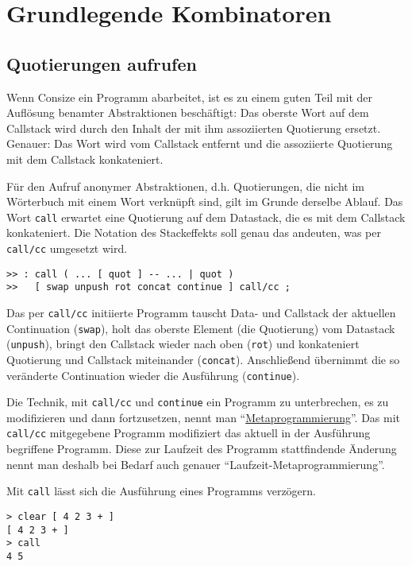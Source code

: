 \section{Grundlegende Kombinatoren}

\subsection{Quotierungen aufrufen}

Wenn Consize ein Programm abarbeitet, ist es zu einem guten Teil mit der Auflösung benamter Abstraktionen beschäftigt: Das oberste Wort auf dem Callstack wird durch den Inhalt der mit ihm assoziierten Quotierung ersetzt. Genauer: Das Wort wird vom Callstack entfernt und die assoziierte Quotierung mit dem Callstack konkateniert.

Für den Aufruf anonymer Abstraktionen, d.h. Quotierungen, die nicht im Wörterbuch mit einem Wort verknüpft sind, gilt im Grunde derselbe Ablauf. Das Wort \verb|call| erwartet eine Quotierung auf dem Datastack, die es mit dem Callstack konkateniert. Die Notation des Stackeffekts soll genau das andeuten, was per \verb|call/cc| umgesetzt wird.

\begin{verbatim}
>> : call ( ... [ quot ] -- ... | quot )
>>   [ swap unpush rot concat continue ] call/cc ;
\end{verbatim}

Das per \verb|call/cc| initiierte Programm tauscht Data- und Callstack der aktuellen Continuation (\verb|swap|), holt das oberste Element (die Quotierung) vom Datastack (\verb|unpush|), bringt den Callstack wieder nach oben (\verb|rot|) und konkateniert Quotierung und Callstack miteinander (\verb|concat|). Anschließend übernimmt die so veränderte Continuation wieder die Aus\-füh\-rung (\verb|continue|).

Die Technik, mit \verb|call/cc| und \verb|continue| ein Programm zu unterbrechen, es zu modifizieren und dann fortzusetzen, nennt man "`\href{http://de.wikipedia.org/wiki/Metaprogrammierung}{Metaprogrammierung}"'. Das mit \verb|call/cc| mitgegebene Programm modifiziert das aktuell in der Ausführung begriffene Programm. Diese zur Laufzeit des Programm stattfindende Änderung nennt man deshalb bei Bedarf auch genauer "`Laufzeit-Metaprogrammierung"'.

Mit \verb|call| lässt sich die Ausführung eines Programms verzögern.

\begin{verbatim}
> clear [ 4 2 3 + ]
[ 4 2 3 + ]
> call
4 5
\end{verbatim}

